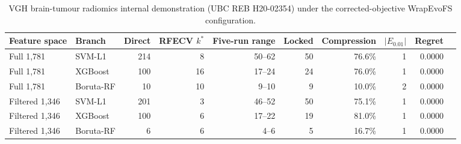 \begin{table}[H]
\centering
\caption{VGH brain-tumour radiomics internal demonstration (UBC REB H20-02354) under the corrected-objective WrapEvoFS configuration.}
\label{tab:supp19}
\scriptsize
\setlength{\tabcolsep}{3.0pt}
\renewcommand{\arraystretch}{1.08}
\begin{tabular}{llrrrrrrrr}
\toprule
Feature space & Branch & Direct & RFECV $k^*$ & Five-run range & Locked & Compression & $|E_{0.01}|$ & Regret \\
\midrule
Full 1,781 & SVM-L1 & 214 & 8 & 50--62 & 50 & 76.6\% & 1 & 0.0000 \\
Full 1,781 & XGBoost & 100 & 16 & 17--24 & 24 & 76.0\% & 1 & 0.0000 \\
Full 1,781 & Boruta-RF & 10 & 10 & 9--10 & 9 & 10.0\% & 2 & 0.0000 \\
Filtered 1,346 & SVM-L1 & 201 & 3 & 46--52 & 50 & 75.1\% & 1 & 0.0000 \\
Filtered 1,346 & XGBoost & 100 & 6 & 17--22 & 19 & 81.0\% & 1 & 0.0000 \\
Filtered 1,346 & Boruta-RF & 6 & 6 & 4--6 & 5 & 16.7\% & 1 & 0.0000 \\
\bottomrule
\end{tabular}


\end{table}
